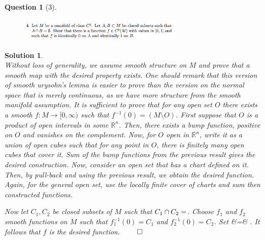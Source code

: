 \documentclass{article} %
\def\eQb#1\eQe{\begin{eqnarray*}#1\end{eqnarray*}}
\theoremstyle{quest}
\newtheorem*{question}{Question}
\newtheorem*{solution}{Solution}
\begin{document}
\begin{question}[3]
\hfill
\begin{figure}[h!]
  \centering
    \includegraphics[width=0.7\textwidth]{DG-e1-p3.png}
\end{figure}
\end{question}
\begin{solution} \hfill \\
Without loss of generality, we assume smooth structure on $M$ and prove that a smooth
map with the desired property exists.
One should remark that this version of smooth urysohn's lemma is easier to prove than
the version on the normal space that is merely continuous, 
as we have more structure from the smooth manifold assumption. It is sufficient to
prove that for any open set $O$ there exists a smooth $f:M \to [0,\infty)$ such that
$f^{-1}(0) = (M\setminus O)$. First suppose that $O$ is a product of open intervals
in some $\mathbb{R}^n$. Then, there exists a bump function, positive on $O$ and
vanishes on the complement. Now, for $O$ open in $\mathbb{R}^n$, write it
as a union of open cubes such that for any point in $O$, there is
finitely many open cubes that cover it. Sum of the bump functions from the previous
result gives the desired construction. Now, consider an open set that has 
a chart defined on it. Then, by pull-back and using the previous result, we obtain
the desired function. Again, for the general open set, use the locally finite 
cover of charts and sum then constructed functions. 

\bigskip

Now let $C_1, C_2$ be closed subsets of $M$ such that $C_1 \cap C_2 = \empty$.
Choose $f_1$ and $f_2$ smooth functions on $M$ such that $f_1^{-1}(0) = C_1$
and $f_2^{-1}(0) = C_2$. Set 
\eQb
f &=& .
\eQe  
It follows that $f$ is the desired function. \hfill $\qed$ 
\end{solution}
\end{document}

